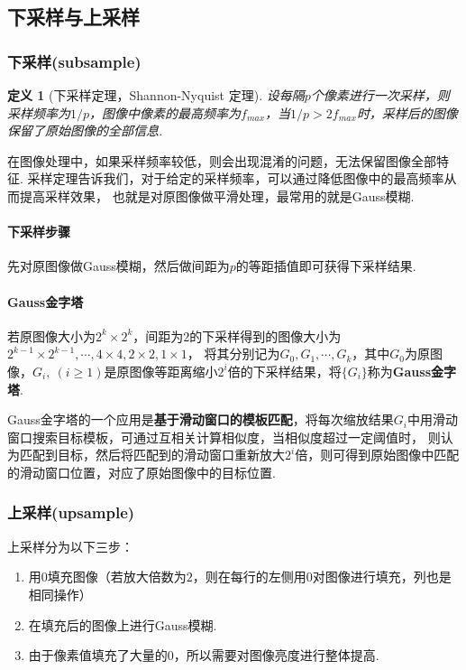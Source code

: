 \documentclass[12pt, a4paper, oneside]{ctexart}
\newtheorem{definition}{定义}
\numberwithin{equation}{section}  %
\theoremstyle{definition}
\let\geq=\geqslant %
\begin{document}
\subsection{下采样与上采样}  %
\subsubsection{下采样(subsample)}
\begin{definition}[下采样定理，Shannon-Nyquist 定理]
    设每隔$p$个像素进行一次采样，则采样频率为$1/p$，图像中像素的最高频率为$f_{max}$，当$1/p > 2f_{max}$时，采样后的图像保留了原始图像的全部信息.
\end{definition}
在图像处理中，如果采样频率较低，则会出现混淆的问题，无法保留图像全部特征. 采样定理告诉我们，对于给定的采样频率，可以通过降低图像中的最高频率从而提高采样效果，
也就是对原图像做平滑处理，最常用的就是Gauss模糊.

\paragraph{下采样步骤}先对原图像做Gauss模糊，然后做间距为$p$的等距插值即可获得下采样结果.

\paragraph{Gauss金字塔}
若原图像大小为$2^k\times 2^k$，间距为$2$的下采样得到的图像大小为$2^{k-1}\times 2^{k-1},\cdots,4\times 4,2\times 2,1\times 1$，
将其分别记为$G_0,G_1,\cdots,G_k$，其中$G_0$为原图像，$G_i,\ (i \geq 1)$是原图像等距离缩小$2^i$倍的下采样结果，将$\{G_i\}$称为\textbf{Gauss金字塔}.

Gauss金字塔的一个应用是\textbf{基于滑动窗口的模板匹配}，将每次缩放结果$G_i$中用滑动窗口搜索目标模板，可通过互相关计算相似度，当相似度超过一定阈值时，
则认为匹配到目标，然后将匹配到的滑动窗口重新放大$2^i$倍，则可得到原始图像中匹配的滑动窗口位置，对应了原始图像中的目标位置.

\subsubsection{上采样(upsample)}
上采样分为以下三步：
\begin{enumerate}
    \item 用$0$填充图像（若放大倍数为$2$，则在每行的左侧用$0$对图像进行填充，列也是相同操作）
    \item 在填充后的图像上进行Gauss模糊.
    \item 由于像素值填充了大量的$0$，所以需要对图像亮度进行整体提高.
\end{enumerate}
\end{document}

